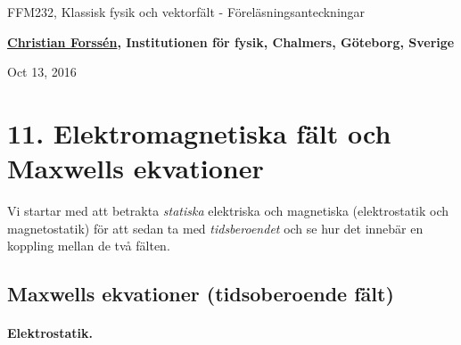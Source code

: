 \documentclass[%
oneside,                 %
final,                   %
10pt]{article}
\begin{document}






\thispagestyle{empty}

\begin{center}
{\LARGE\bf
\begin{spacing}{1.25}
FFM232, Klassisk fysik och vektorfält - Föreläsningsanteckningar
\end{spacing}
}
\end{center}


\begin{center}
{\bf \href{{http://fy.chalmers.se/subatom/tsp/}}{Christian Forssén}, Institutionen för fysik, Chalmers, Göteborg, Sverige${}^{}$} \\ [0mm]
\end{center}

\begin{center}
\end{center}
    

\begin{center}
Oct 13, 2016
\end{center}

\vspace{1cm}


\section{11. Elektromagnetiska fält och Maxwells ekvationer}

Vi startar med att betrakta \emph{statiska} elektriska och magnetiska (elektrostatik och magnetostatik) för att sedan ta med \emph{tidsberoendet} och se hur det innebär en koppling mellan de två fälten.

\subsection{Maxwells ekvationer (tidsoberoende fält)}


\paragraph{Elektrostatik.}
\end{document}
